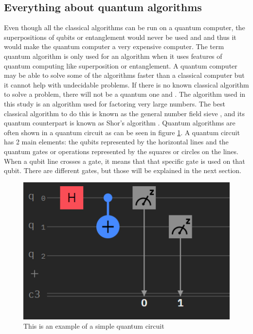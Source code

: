 \subsection{Everything about quantum algorithms}
Even though all the classical algorithms can be run on a quantum computer, the superpositions of qubits or entanglement would never be used \autocite{qalgo} and \autocite{quantumalgo} and thus it would make the quantum computer a very expensive computer.
The term quantum algorithm is only used for an algorithm when it uses features of quantum computing like superposition or entanglement.
A quantum computer may be able to solve some of the algorithms faster than a classical computer but it cannot help with undecidable problems. If there is no known classical algorithm to solve a problem, there will not be a quantum one \autocite{undecidable} and \autocite{quantumalgo}.
The algorithm used in this study is an algorithm used for factoring very large numbers. The best classical algorithm to do this is known as the general number field sieve \autocite{GNFS}, and its quantum counterpart is known as Shor's algorithm \autocite{Shor}.
Quantum algorithms are often shown in a quantum circuit as can be seen in figure \ref{fig:Quantum circuit}. A quantum circuit has 2 main elements: the qubits represented by the horizontal lines and the quantum gates or operations represented by the squares or circles on the lines.
When a qubit line crosses a gate, it means that that specific gate is used on that qubit. There are different gates, but those will be explained in the next section.

\begin{figure} [h]
    \centering
    \includegraphics[width=\textwidth]{img/circuitVB.PNG}
        \caption{This is an example of a simple quantum circuit}
        \label{fig:Quantum circuit}
\end{figure}

